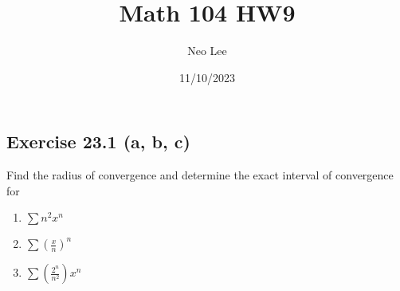 \documentclass{article}
\title{Math 104 HW9}
\author{Neo Lee}
\date{11/10/2023}
\begin{document}
 

\maketitle 

\subsection*{Exercise 23.1 (a, b, c)}
Find the radius of convergence and determine the exact interval of convergence for
\begin{enumerate}[label=\textbf{(\alph*)}]
    \item $\sum n^2x^n$
    \item $\sum \left(\frac{x}{n}\right)^n$
    \item $\sum\left(\frac{2^n}{n^2}\right)x^n$
\end{enumerate}
\end{document}
